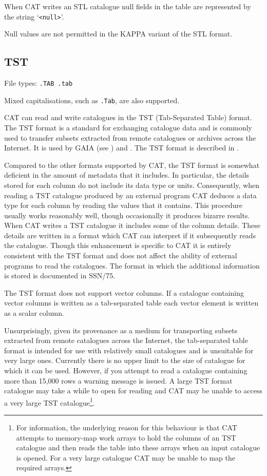 When CAT writes an STL catalogue null fields in the table are
represented by the string `\verb-<null>-'.

Null values are not permitted in the KAPPA variant of the STL format.


\subsection{TST}

File types: {\tt .TAB  .tab}

Mixed capitalisations, such as {\tt .Tab}, are also supported.

CAT can read and write catalogues in the TST (Tab-Separated Table)
format.  The TST format is a standard for exchanging catalogue data
and is commonly used to transfer subsets extracted from remote catalogues
or archives across the Internet.  It is used by GAIA (see
\cite{SUN214}) and
.
The TST format is described in
\cite{SSN75}.

Compared to the other formats supported by CAT, the TST format is
somewhat deficient in the amount of metadata that it includes.  In
particular, the details stored for each column do not include its data
type or units.  Consequently, when reading a TST catalogue produced by
an external program CAT deduces a data type for each column by reading
the values that it contains.  This procedure usually works reasonably
well, though occasionally it produces bizarre results.  When CAT writes
a TST catalogue it includes some of the column details.  These details
are written in a format which CAT can interpret if it subsequently
reads the catalogue.  Though this enhancement is specific to CAT it is
entirely consistent with the TST format and does not affect the ability
of external programs to read the catalogues.  The format in which the
additional information is stored is documented in SSN/75.

The TST format does not support vector columns.  If a catalogue
containing vector columns is written as a tab-separated table each vector
element is written as a scalar column.

Unsurprisingly, given its provenance as a medium for transporting
subsets extracted from remote catalogues across the Internet, the
tab-separated table format is intended for use with relatively small
catalogues and is unsuitable for very large ones.  Currently there is no
upper limit to the size of catalogue for which it can be used.  However,
if you attempt to read a catalogue containing more than 15,000 rows a
warning message is issued.  A large TST format catalogue may take a while
to open for reading and CAT may be unable to access a very large TST
catalogue\footnote{For information, the underlying reason for this
behaviour is that CAT attempts to memory-map work arrays to hold the
columns of an TST catalogue and then reads the table into these arrays
when an input catalogue is opened.  For a very large catalogue CAT may
be unable to map the required arrays.}.

